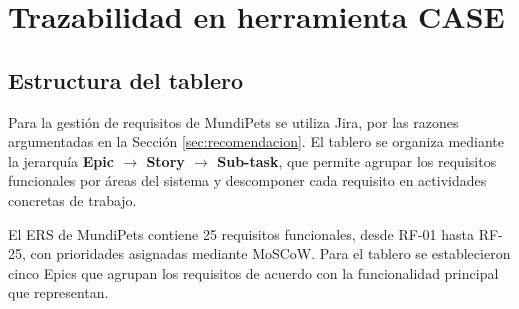 \documentclass[journal,onecolumn]{IEEEtran}
\begin{document}
	\section{Trazabilidad en herramienta CASE}
	
	\subsection{Estructura del tablero}
	
	Para la gestión de requisitos de MundiPets se utiliza Jira, por las razones argumentadas en la
	Sección \ref{sec:recomendacion}. El tablero se organiza mediante la jerarquía
	\textbf{Epic $\rightarrow$ Story $\rightarrow$ Sub-task}, que permite agrupar los requisitos
	funcionales por áreas del sistema y descomponer cada requisito en actividades concretas de
	trabajo.
	
	El ERS de MundiPets contiene 25 requisitos funcionales, desde RF-01 hasta RF-25, con prioridades
	asignadas mediante MoSCoW. Para el tablero se establecieron cinco Epics que agrupan los requisitos
	de acuerdo con la funcionalidad principal que representan.
	
\end{document}
